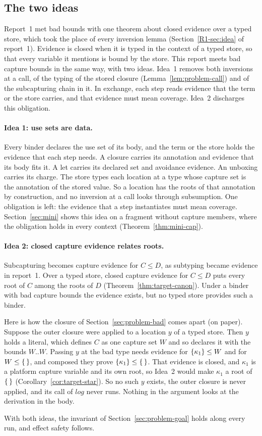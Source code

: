 \subsection{The two ideas}\label{sec:problem-ideas}

Report~1 met bad bounds with one theorem about closed evidence over a typed store, which took the place of every inversion lemma (Section~\ref{R1-sec:idea} of report~1). Evidence is closed when it is typed in the context of a typed store, so that every variable it mentions is bound by the store. This report meets bad capture bounds in the same way, with two ideas. Idea~1 removes both inversions at a call, of the typing of the stored closure (Lemma~\ref{lem:problem-call}) and of the subcapturing chain in it. In exchange, each step reads evidence that the term or the store carries, and that evidence must mean coverage. Idea~2 discharges this obligation.

\paragraph{Idea 1: use sets are data.}
Every binder declares the use set of its body, and the term or the store holds the evidence that each step needs. A closure carries its annotation and evidence that its body fits it. A let carries its declared set and avoidance evidence. An unboxing carries its charge. The store types each location at a type whose capture set is the annotation of the stored value. So a location has the roots of that annotation by construction, and no inversion at a call looks through subsumption. One obligation is left: the evidence that a step instantiates must mean coverage. Section~\ref{sec:mini} shows this idea on a fragment without capture members, where the obligation holds in every context (Theorem~\ref{thm:mini-cap}).

\paragraph{Idea 2: closed capture evidence relates roots.}
Subcapturing becomes capture evidence for $C \le D$, as subtyping became evidence in report~1. Over a typed store, closed capture evidence for $C \le D$ puts every root of $C$ among the roots of $D$ (Theorem~\ref{thm:target-canon}). Under a binder with bad capture bounds the evidence exists, but no typed store provides such a binder.

Here is how the closure of Section~\ref{sec:problem-bad} comes apart (on paper). Suppose the outer closure were applied to a location $y$ of a typed store. Then $y$ holds a literal, which defines $C$ as one capture set $W$ and so declares it with the bounds $W..W$. Passing $y$ at the bad type needs evidence for $\{\kappa_1\} \le W$ and for $W \le \{\,\}$, and composed they prove $\{\kappa_1\} \le \{\,\}$. That evidence is closed, and $\kappa_1$ is a platform capture variable and its own root, so Idea~2 would make $\kappa_1$ a root of $\{\,\}$ (Corollary~\ref{cor:target-star}). So no such $y$ exists, the outer closure is never applied, and its call of $\mathit{log}$ never runs. Nothing in the argument looks at the derivation in the body.

With both ideas, the invariant of Section~\ref{sec:problem-goal} holds along every run, and effect safety follows.
